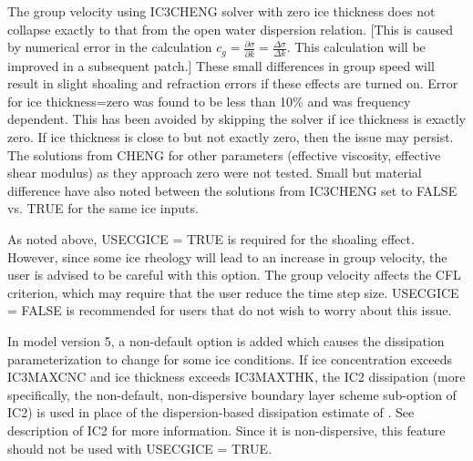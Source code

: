 The group velocity using {\code IC3CHENG} solver with zero ice thickness does not collapse exactly to that from the open water dispersion relation. [This is caused by numerical error in the calculation $c_g = \frac{\partial \sigma}{\partial k} = \frac{\Delta \sigma}{\Delta k} $. This calculation will be improved in a subsequent patch.] These small differences in group speed will result in slight shoaling and refraction errors if these effects are turned on. Error for ice thickness=zero was found to be less than 10\% and was frequency dependent. This has been avoided by skipping the solver if ice thickness is exactly zero. If ice thickness is close to but not exactly zero, then the issue may persist. The solutions from CHENG for other parameters (effective viscosity, effective shear modulus) as they approach zero were not tested. Small but material difference have also noted between the solutions from {\code IC3CHENG} set to {\code FALSE} vs. {\code TRUE} for the same ice inputs.

As noted above, {\code USECGICE = TRUE} is required for the shoaling effect. However, since some ice rheology will lead to an increase in group velocity, the user is advised to be careful with this option. The group velocity affects the CFL criterion, which may require that the user reduce the time step size. {\code USECGICE = FALSE} is recommended for users that do not wish to worry about this issue.

In model version 5, a non-default option is added which causes the dissipation parameterization to change for some ice conditions. If ice concentration exceeds {\code IC3MAXCNC} and ice thickness exceeds {\code IC3MAXTHK}, the {\code IC2} dissipation (more specifically, the non-default, non-dispersive boundary layer scheme sub-option of {\code IC2}) is used in place of the dispersion-based dissipation estimate of \cite{art:WS10}. See description of {\code IC2} for more information. Since it is non-dispersive, this feature should not be used with {\code USECGICE = TRUE}.
